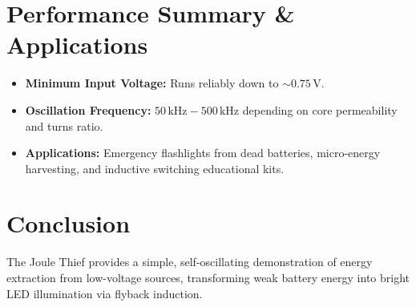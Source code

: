 \documentclass[11pt,a4paper]{article}
\begin{document}
\section{Performance Summary \& Applications}
\begin{itemize}
    \item \textbf{Minimum Input Voltage:} Runs reliably down to $\sim 0.75\,\text{V}$.
    \item \textbf{Oscillation Frequency:} $50\,\text{kHz} - 500\,\text{kHz}$ depending on core permeability and turns ratio.
    \item \textbf{Applications:} Emergency flashlights from dead batteries, micro-energy harvesting, and inductive switching educational kits.
\end{itemize}

\section{Conclusion}
The Joule Thief provides a simple, self-oscillating demonstration of energy extraction from low-voltage sources, transforming weak battery energy into bright LED illumination via flyback induction.
\end{document}
